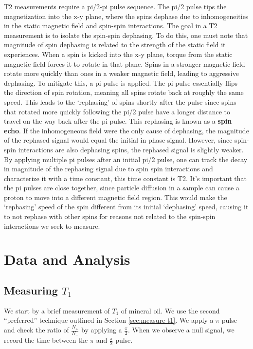\documentclass[%
 reprint,
 amsmath,amssymb,
 aps,
]{revtex4-2}
\newcommand{\halfpi}{\frac{\pi}{2}}
\begin{document}
T2 measurements require a pi/2-pi pulse sequence. The pi/2 pulse tips the magnetization into the x-y plane, where the spins dephase due to inhomogeneities in the static magnetic field and spin-spin interactions. The goal in a T2 measurement is to isolate the spin-spin dephasing.  To do this, one must note that magnitude of spin dephasing is related to the strength of the static field it experiences. When a spin is kicked into the x-y plane, torque from the static magnetic field forces it to rotate in that plane. Spins in a stronger magnetic field rotate more quickly than ones in a weaker magnetic field, leading to aggressive dephasing. To mitigate this, a pi pulse is applied. The pi pulse essentially flips the direction of spin rotation, meaning all spins rotate back at roughly the same speed. This leads to the `rephasing' of spins shortly after the pulse since spins that rotated more quickly following the pi/2 pulse have a longer distance to travel on the way back after the pi pulse. This rephasing is known as a \textbf{spin echo}. If the inhomogeneous field were the only cause of dephasing, the magnitude of the rephased signal would equal the initial in phase signal. However, since spin-spin interactions are also dephasing spins, the rephased signal is slightly weaker. By applying multiple pi pulses after an initial pi/2 pulse, one can track the decay in magnitude of the rephasing signal due to spin spin interactions and characterize it with a time constant, this time constant is T2. It's important that the pi pulses are close together, since particle diffusion in a sample can cause a proton to move into a different magnetic field region. This would make the `rephasing' speed of the spin different from its initial `dephasing' speed, causing it to not rephase with other spins for reasons not related to the spin-spin interactions we seek to measure. 

\section{Data and Analysis}

\subsection{Measuring $T_1$}

We start by a brief measurement of $T_1$ of mineral oil. We use the second ``preferred'' technique outlined in Section \ref{sec:measure-t1}. We apply a $\pi$ pulse and check the ratio of $\frac{N_+}{N_-}$ by applying a $\halfpi$. When we observe a null signal, we record the time between the $\pi$ and $\halfpi$ pulse. 
\end{document}
